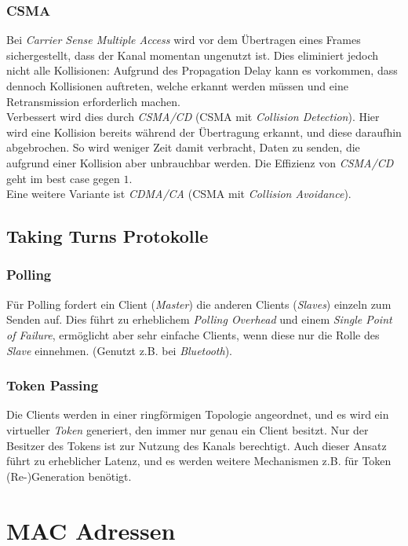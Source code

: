 \subsubsection{CSMA}
Bei \emph{Carrier Sense Multiple Access} wird vor dem Übertragen eines Frames sichergestellt, dass der Kanal momentan ungenutzt ist. Dies eliminiert jedoch nicht alle Kollisionen: Aufgrund des Propagation Delay kann es vorkommen, dass dennoch Kollisionen auftreten, welche erkannt werden müssen und eine Retransmission erforderlich machen.\\
Verbessert wird dies durch \emph{CSMA/CD} (CSMA mit \emph{Collision Detection}). Hier wird eine Kollision bereits während der Übertragung erkannt, und diese daraufhin abgebrochen. So wird weniger Zeit damit verbracht, Daten zu senden, die aufgrund einer Kollision aber unbrauchbar werden. Die Effizienz von \emph{CSMA/CD} geht im best case gegen $1$.\\
Eine weitere Variante ist \emph{CDMA/CA} (CSMA mit \emph{Collision Avoidance}).

\subsection{Taking Turns Protokolle}
\subsubsection{Polling}
Für Polling fordert ein Client (\emph{Master}) die anderen Clients (\emph{Slaves}) einzeln zum Senden auf. Dies führt zu erheblichem \emph{Polling Overhead} und einem \emph{Single Point of Failure}, ermöglicht aber sehr einfache Clients, wenn diese nur die Rolle des \emph{Slave} einnehmen. (Genutzt z.B. bei \emph{Bluetooth}).

\subsubsection{Token Passing}
Die Clients werden in einer ringförmigen Topologie angeordnet, und es wird ein virtueller \emph{Token} generiert, den immer nur genau ein Client besitzt. Nur der Besitzer des Tokens ist zur Nutzung des Kanals berechtigt. Auch dieser Ansatz führt zu erheblicher Latenz, und es werden weitere Mechanismen z.B. für Token (Re-)Generation benötigt.

\section{MAC Adressen}
\label{sec:mac-address}
